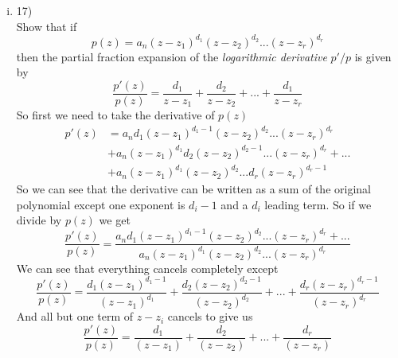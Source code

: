 \documentclass[11pt]{article}
\begin{document}
\begin{enumerate}
\begin{enumerate}[(i)]
\begin{enumerate}[(a)]
\end{enumerate}

\item 17)\\
Show that if 
$$p(z) = a_n(z-z_1)^{d_1}(z-z_2)^{d_2}...(z-z_r)^{d_r}$$
then the partial fraction expansion of the \emph{logarithmic derivative} $p'/p$ is given by
$$\frac{p'(z)}{p(z)}= \frac{d_1}{z-z_1}+\frac{d_2}{z-z_2}+...+\frac{d_1}{z-z_r}$$
So first we need to take the derivative of $p(z)$
\begin{align*}
p'(z) &= a_nd_1(z-z_1)^{d_1-1}(z-z_2)^{d_2}...(z-z_r)^{d_r}\\
 	&+ a_n(z-z_1)^{d_1}d_2(z-z_2)^{d_2-1}...(z-z_r)^{d_r}+...\\
	&+ a_n(z-z_1)^{d_1}(z-z_2)^{d_2}...d_r(z-z_r)^{d_r-1}
\end{align*}
So we can see that the derivative can be written as a sum of the original polynomial except one exponent is $d_i-1$ and a $d_i$ leading term. So if we divide by $p(z)$ we get
$$\frac{p'(z)}{p(z)}= \frac{a_nd_1(z-z_1)^{d_1-1}(z-z_2)^{d_2}...(z-z_r)^{d_r}+...}{a_n(z-z_1)^{d_1}(z-z_2)^{d_2}...(z-z_r)^{d_r}}$$
We can see that everything cancels completely except
$$\frac{p'(z)}{p(z)}= \frac{d_1(z-z_1)^{d_1-1}}{(z-z_1)^{d_1}}+\frac{d_2(z-z_2)^{d_2-1}}{(z-z_2)^{d_2}}+...+\frac{d_r(z-z_r)^{d_r-1}}{(z-z_r)^{d_r}}$$
And all but one term of $z-z_i$ cancels to give us
$$\frac{p'(z)}{p(z)}= \frac{d_1}{(z-z_1)}+\frac{d_2}{(z-z_2)}+...+\frac{d_r}{(z-z_r)}$$
\end{enumerate}
\end{enumerate}
\end{document}
